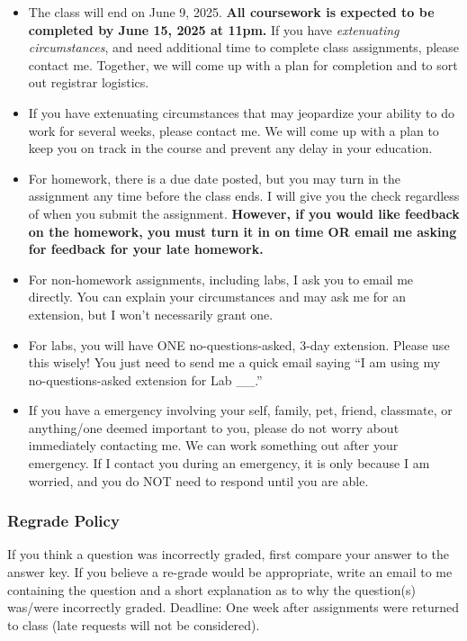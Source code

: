 \documentclass[
  letterpaper,
  DIV=11,
  numbers=noendperiod]{scrartcl}
\begin{document}
\begin{itemize}
\item
  The class will end on June 9, 2025. \textbf{All coursework is expected
  to be completed by June 15, 2025 at 11pm.} If you have
  \emph{extenuating circumstances}, and need additional time to complete
  class assignments, please contact me. Together, we will come up with a
  plan for completion and to sort out registrar logistics.
\item
  If you have extenuating circumstances that may jeopardize your ability
  to do work for several weeks, please contact me. We will come up with
  a plan to keep you on track in the course and prevent any delay in
  your education.
\item
  For homework, there is a due date posted, but you may turn in the
  assignment any time before the class ends. I will give you the check
  regardless of when you submit the assignment. \textbf{However, if you
  would like feedback on the homework, you must turn it in on time OR
  email me asking for feedback for your late homework.}
\item
  For non-homework assignments, including labs, I ask you to email me
  directly. You can explain your circumstances and may ask me for an
  extension, but I won't necessarily grant one.
\item
  For labs, you will have ONE no-questions-asked, 3-day extension.
  Please use this wisely! You just need to send me a quick email saying
  ``I am using my no-questions-asked extension for Lab \_\_.''
\item
  If you have a emergency involving your self, family, pet, friend,
  classmate, or anything/one deemed important to you, please do not
  worry about immediately contacting me. We can work something out after
  your emergency. If I contact you during an emergency, it is only
  because I am worried, and you do NOT need to respond until you are
  able.~
\end{itemize}

\subsubsection{Regrade Policy}\label{regrade-policy}

If you think a question was incorrectly graded, first compare your
answer to the answer key. If you believe a re-grade would be
appropriate, write an email to me containing the question and a short
explanation as to why the question(s) was/were incorrectly graded.
Deadline: One week after assignments were returned to class (late
requests will not be considered).
\end{document}
